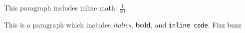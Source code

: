 
This paragraph includes inline math: $\frac{1}{50}$

This is a paragraph which includes \textit{italics}, \textbf{bold}, and \verb|inline code|. Fizz buzz